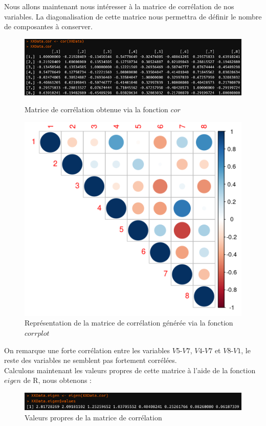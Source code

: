\documentclass[11pt]{article}
\begin{document}
\noindent Nous allons maintenant nous intéresser à la matrice de corrélation de nos variables. La diagonalisation de cette matrice nous permettra de définir le nombre de composantes à conserver.\begin{figure}[H]
\centering
\includegraphics[scale=0.7]{cor.png}
\caption{Matrice de corrélation obtenue via la fonction $cor$}
\includegraphics[scale=1]{corrplot.png}
\caption{Représentation de la matrice de corrélation générée via la fonction $corrplot$}
\end{figure}
\noindent On remarque une forte corrélation entre les variables $V5$-$V7$, $V4$-$V7$ et $V8$-$V1$, le reste des variables ne semblent pas fortement corrélées.\\
\newpage
\noindent Calculons maintenant les valeurs propres de cette matrice à l'aide de la fonction $eigen$ de R, nous obtenons :
\begin{figure}[H]
\centering
\includegraphics[scale=0.7]{eigen.png}
\caption{Valeurs propres de la matrice de corrélation}
\end{figure}
\end{document}

